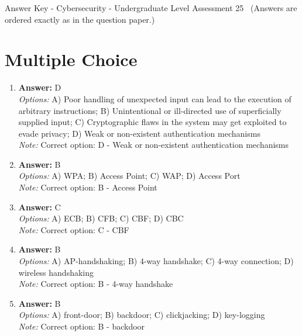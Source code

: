 \documentclass[12pt]{article}
\begin{document}
\begin{center}
Answer Key - Cybersecurity - Undergraduate Level Assessment 25 \
\small (Answers are ordered exactly as in the question paper.)
\end{center}

\section*{Multiple Choice}
\begin{enumerate}[label=\arabic*.]
\item \textbf{Answer:} D
\\ \textit{Options:} A) Poor handling of unexpected input can lead to the execution of arbitrary instructions; B) Unintentional or ill-directed use of superficially supplied input; C) Cryptographic flaws in the system may get exploited to evade privacy; D) Weak or non-existent authentication mechanisms
\\ \textit{Note:} Correct option: D - Weak or non-existent authentication mechanisms
\item \textbf{Answer:} B
\\ \textit{Options:} A) WPA; B) Access Point; C) WAP; D) Access Port
\\ \textit{Note:} Correct option: B - Access Point
\item \textbf{Answer:} C
\\ \textit{Options:} A) ECB; B) CFB; C) CBF; D) CBC
\\ \textit{Note:} Correct option: C - CBF
\item \textbf{Answer:} B
\\ \textit{Options:} A) AP-handshaking; B) 4-way handshake; C) 4-way connection; D) wireless handshaking
\\ \textit{Note:} Correct option: B - 4-way handshake
\item \textbf{Answer:} B
\\ \textit{Options:} A) front-door; B) backdoor; C) clickjacking; D) key-logging
\\ \textit{Note:} Correct option: B - backdoor
\end{enumerate}
\end{document}
